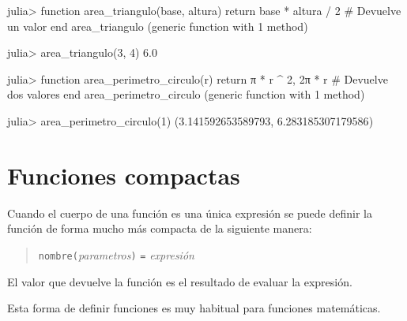 \documentclass[
  letterpaper,
  DIV=11,
  numbers=noendperiod]{scrreprt}
\newenvironment{Shaded}{\begin{snugshade}}{\end{snugshade}}
\newcommand{\CommentTok}[1]{\textcolor[rgb]{0.37,0.37,0.37}{#1}}
\newcommand{\ConstantTok}[1]{\textcolor[rgb]{0.56,0.35,0.01}{#1}}
\newcommand{\ControlFlowTok}[1]{\textcolor[rgb]{0.00,0.23,0.31}{#1}}
\newcommand{\FloatTok}[1]{\textcolor[rgb]{0.68,0.00,0.00}{#1}}
\newcommand{\FunctionTok}[1]{\textcolor[rgb]{0.28,0.35,0.67}{#1}}
\newcommand{\KeywordTok}[1]{\textcolor[rgb]{0.00,0.23,0.31}{#1}}
\newcommand{\NormalTok}[1]{\textcolor[rgb]{0.00,0.23,0.31}{#1}}
\newcommand{\OperatorTok}[1]{\textcolor[rgb]{0.37,0.37,0.37}{#1}}
\begin{document}
\begin{Shaded}
\begin{Highlighting}[]
\NormalTok{julia}\OperatorTok{\textgreater{}} \KeywordTok{function} \FunctionTok{area\_triangulo}\NormalTok{(base, altura)}
         \ControlFlowTok{return}\NormalTok{ base }\OperatorTok{*}\NormalTok{ altura }\OperatorTok{/} \FloatTok{2}  \CommentTok{\# Devuelve un valor}
       \KeywordTok{end}
\NormalTok{area\_triangulo (generic }\KeywordTok{function}\NormalTok{ with }\FloatTok{1}\NormalTok{ method)}

\NormalTok{julia}\OperatorTok{\textgreater{}} \FunctionTok{area\_triangulo}\NormalTok{(}\FloatTok{3}\NormalTok{, }\FloatTok{4}\NormalTok{)}
\FloatTok{6.0}

\NormalTok{julia}\OperatorTok{\textgreater{}} \KeywordTok{function} \FunctionTok{area\_perimetro\_circulo}\NormalTok{(r)}
         \ControlFlowTok{return} \ConstantTok{π} \OperatorTok{*}\NormalTok{ r }\OperatorTok{\^{}} \FloatTok{2}\NormalTok{, }\FloatTok{2}\NormalTok{π }\OperatorTok{*}\NormalTok{ r  }\CommentTok{\# Devuelve dos valores }
       \KeywordTok{end}
\NormalTok{area\_perimetro\_circulo (generic }\KeywordTok{function}\NormalTok{ with }\FloatTok{1}\NormalTok{ method)}

\NormalTok{julia}\OperatorTok{\textgreater{}} \FunctionTok{area\_perimetro\_circulo}\NormalTok{(}\FloatTok{1}\NormalTok{)}
\NormalTok{(}\FloatTok{3.141592653589793}\NormalTok{, }\FloatTok{6.283185307179586}\NormalTok{)}
\end{Highlighting}
\end{Shaded}

\hypertarget{funciones-compactas}{%
\section{Funciones compactas}\label{funciones-compactas}}

Cuando el cuerpo de una función es una única expresión se puede definir
la función de forma mucho más compacta de la siguiente manera:

\begin{quote}
\texttt{nombre(}\emph{parametros}\texttt{)} \texttt{=} \emph{expresión}
\end{quote}

El valor que devuelve la función es el resultado de evaluar la
expresión.

Esta forma de definir funciones es muy habitual para funciones
matemáticas.
\end{document}
